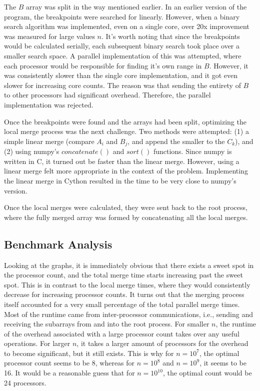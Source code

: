 \documentclass[12pt]{article}
\begin{document}
{    The $B$ array was split in the way mentioned earlier. In an earlier version of the program, the breakpoints were searched for linearly. However, when a binary search algorithm was implemented, even on a single core, over 20x improvement was measured for large values $n$. It's worth noting that since the breakpoints would be calculated serially, each subsequent binary search took place over a smaller search space. A parallel implementation of this was attempted, where each processor would be responsible for finding it's own range in $B$. However, it was consistently slower than the single core implementation, and it got even slower for increasing core counts. The reason was that sending the entirety of $B$ to other processors had significant overhead. Therefore, the parallel implementation was rejected.

    Once the breakpoints were found and the arrays had been split, optimizing the local merge process was the next challenge. Two methods were attempted: (1) a simple linear merge (compare $A_i$ and $B_j$, and append the smaller to the $C_k$), and (2) using numpy's $concatenate()$ and $sort()$ functions. Since numpy is written in C, it turned out be faster than the linear merge. However, using a linear merge felt more appropriate in the context of the problem. Implementing the linear merge in Cython resulted in the time to be very close to numpy's version.

    Once the local merges were calculated, they were sent back to the root process, where the fully merged array was formed by concatenating all the local merges. 

    \subsection{Benchmark Analysis}
    Looking at the graphs, it is immediately obvious that there exists a sweet spot in the processor count, and the total merge time starts increasing past the sweet spot. This is in contrast to the local merge times, where they would consistently decrease for increasing processor counts. It turns out that the merging process itself accounted for a very small percentage of the total parallel merge times. Most of the runtime came from inter-processor communications, i.e., sending and receiving the subarrays from and into the root process. For smaller $n$, the runtime of the overhead associated with a large processor count takes over any useful operations. For larger $n$, it takes a larger amount of processors for the overhead to become significant, but it still exists. This is why for $n = 10^7$, the optimal processor count seems to be 8, whereas for $n = 10^8$ and $n = 10^9$, it seems to be 16. It would be a reasonable guess that for $n = 10^{10}$, the optimal count would be 24 processors.

}
\end{document}
